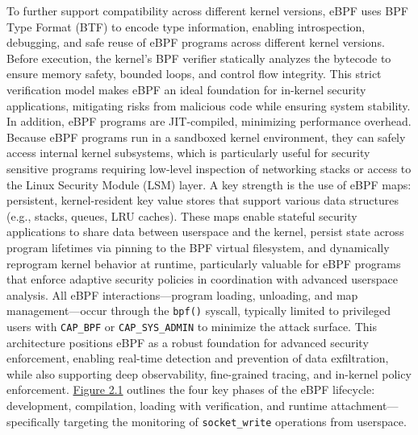 \documentclass [11pt, proquest] {uwthesis}[2020/02/24]
\begin{document}
To further support compatibility across different kernel versions, eBPF uses BPF Type Format (BTF) to encode type information, enabling introspection, debugging, and safe reuse of eBPF programs across different kernel versions. Before execution, the kernel’s BPF verifier statically analyzes the bytecode to ensure memory safety, bounded loops, and control flow integrity. This strict verification model makes eBPF an ideal foundation for in-kernel security applications, mitigating risks from malicious code while ensuring system stability. In addition, eBPF programs are JIT-compiled, minimizing performance overhead. Because eBPF programs run in a sandboxed kernel environment, they can safely access internal kernel subsystems, which is particularly useful for security sensitive programs requiring low-level inspection of networking stacks or access to the Linux Security Module (LSM) layer. A key strength is the use of eBPF maps: persistent, kernel-resident key value stores that support various data structures (e.g., stacks, queues, LRU caches). These maps enable stateful security applications to share data between userspace and the kernel, persist state across program lifetimes via pinning to the BPF virtual filesystem, and dynamically reprogram kernel behavior at runtime, particularly valuable for eBPF programs that enforce adaptive security policies in coordination with advanced userspace analysis. All eBPF interactions—program loading, unloading, and map management—occur through the \texttt{bpf()} syscall, typically limited to privileged users with \texttt{CAP\_BPF} or \texttt{CAP\_SYS\_ADMIN} to minimize the attack surface. This architecture positions eBPF as a robust foundation for advanced security enforcement, enabling real-time detection and prevention of data exfiltration, while also supporting deep observability, fine-grained tracing, and in-kernel policy enforcement. \hyperref[fig:eBPF-injection]{Figure 2.1} outlines the four key phases of the eBPF lifecycle: development, compilation, loading with verification, and runtime attachment—specifically targeting the monitoring of \texttt{socket_write} operations from userspace.
\end{document}
